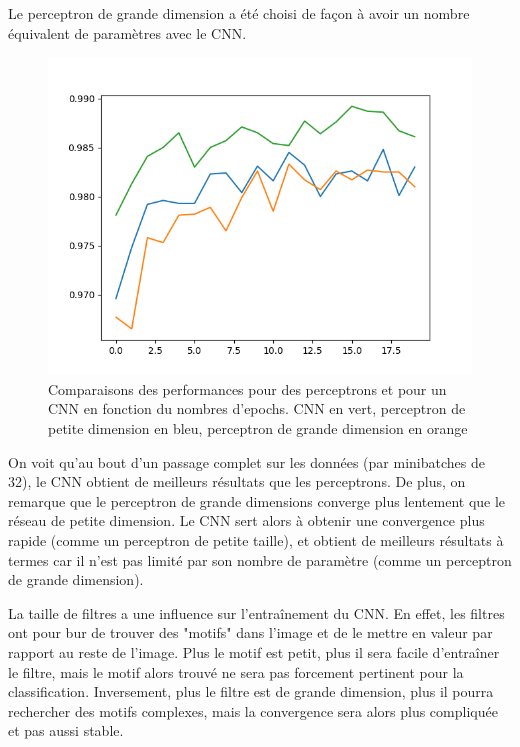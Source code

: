 Le perceptron de grande dimension a été choisi de façon à avoir un nombre équivalent de paramètres avec le CNN.

\newpage

\begin{figure}[h]
    \center 
    \includegraphics{img/fc_vs_cnn.png}
    \caption{Comparaisons des performances pour des perceptrons et pour un CNN en fonction du nombres d'epochs. 
    CNN en vert, perceptron de petite dimension en bleu, perceptron de grande dimension en orange}
\end{figure}

On voit qu'au bout d'un passage complet sur les données (par minibatches de 32), le CNN obtient de meilleurs résultats que les 
perceptrons. De plus, on remarque que le perceptron de grande dimensions converge plus lentement que le réseau de petite dimension.
Le CNN sert alors à obtenir une convergence plus rapide (comme un perceptron de petite taille),
et obtient de meilleurs résultats à termes car il n'est pas limité par son nombre de paramètre (comme un perceptron de grande dimension).

La taille de filtres a une influence sur l'entraînement du CNN. En effet, les filtres ont pour bur de trouver des "motifs" dans l'image 
et de le mettre en valeur par rapport au reste de l'image. Plus le motif est petit, plus il sera facile d'entraîner le filtre, mais 
le motif alors trouvé ne sera pas forcement pertinent pour la classification. Inversement, plus le filtre est de grande dimension, plus 
il pourra rechercher des motifs complexes, mais la convergence sera alors plus compliquée et pas aussi stable.

